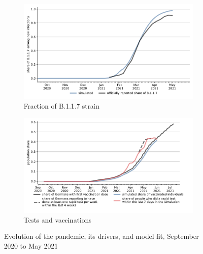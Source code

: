 \documentclass[12pt]{article}
\begin{document}
\begin{figure}[!tp]
\begin{subfigure}[b]{0.475\textwidth}
        \includegraphics[width=\textwidth]{../figures/results/figures/scenario_comparisons/combined_fit/full_share_b117}

        \caption{Fraction of B.1.1.7 strain}
        \label{fig:share_b117}
    \end{subfigure}
    \hfill
    \begin{subfigure}[b]{0.475\textwidth}
        \centering

        \includegraphics[width=\textwidth]{../figures/results/figures/scenario_comparisons/combined_fit/full_share_rapid_test_in_last_week_and_vaccinated}

        \caption{{Tests and vaccinations}}
        \label{fig:antigen_tests_vaccinations}
    \end{subfigure}

    \caption{Evolution of the pandemic, its drivers, and model fit, September 2020 to May 2021}
    \label{fig:pandemic_drivers_model_fit}


\end{figure}
\end{document}
